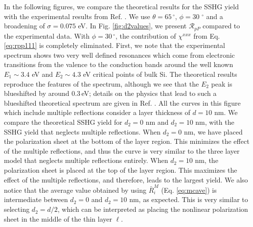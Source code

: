 \documentclass[aps,prb,10pt,showpacs,letterpaper,twocolumn]{revtex4-1}
\begin{document}
In the following figures, we compare the theoretical results for the SSHG yield
with the experimental results from Ref. . We use $\theta
= 65\,^{\circ}$, $\phi = 30\,\,^{\circ}$ and a broadening of $\sigma = 0.075$
eV. In Fig. \ref{fig:d2values}, we present $\mathcal{R}_{pP}$ compared to the
experimental data. With $\phi = 30\,^{\circ}$, the contribution of $\chi^{xxx}$
from Eq. \eqref{eq:rpp111} is completely eliminated. First, we note that the
experimental spectrum shows two very well defined resonances which come from
electronic transitions from the valence to the conduction bands around the well
known $E_{1}\sim 3.4$ eV and $E_{2}\sim 4.3$ eV critical points of bulk
Si.\cite{yubook} The theoretical results reproduce the features of the spectrum,
although we see that the $E_{2}$ peak is blueshifted by around 0.3\,eV; details
on the physics that lead to such a blueshifted theoretical spectrum are given in
Ref. . All the curves in this figure which include
multiple reflections consider a layer thickness of $d = 10$ nm. We compare the
theoretical SSHG yield for $d_{2} = 0$ nm and $d_{2} = 10$ nm, with the SSHG
yield that neglects multiple reflections. When $d_{2} = 0$ nm, we have placed
the polarization sheet at the bottom of the layer region. This minimizes the
effect of the multiple reflections, and thus the curve is very similar to the
three layer model that neglects multiple reflections entirely. When $d_{2} = 10$
nm, the polarization sheet is placed at the top of the layer region. This
maximizes the effect of the multiple reflections, and therefore, leads to the
largest yield. We also notice that the average value obtained by using
$\bar{R}^{M}_{i}$ (Eq. \eqref{eq:mcave}) is intermediate between $d_{2} = 0$ and
$d_{2} = 10$ nm, as expected. This is very similar to selecting $d_{2} = d/2$,
which can be interpreted as placing the nonlinear polarization sheet in the
middle of the thin layer $\ell$.
\end{document}
